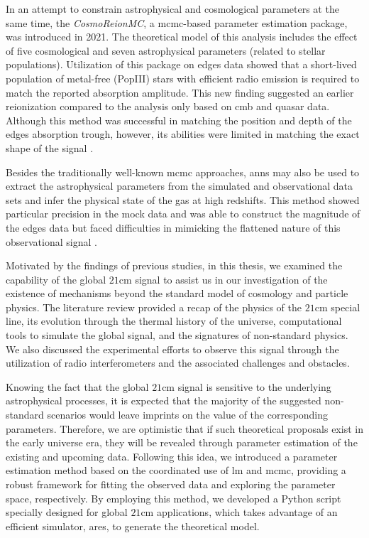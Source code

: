 \documentclass[12pt, TexShade, letterpaper]{report}
\begin{document}
In an attempt to constrain astrophysical and cosmological parameters at the same time, the \emph{CosmoReionMC}, a \gls{mcmc}-based parameter estimation package, was introduced in 2021. The theoretical model of this analysis includes the effect of five cosmological and seven astrophysical parameters (related to stellar populations). Utilization of this package on \gls{edges} data showed that a short-lived population of metal-free (PopIII) stars with efficient radio emission is required to match the reported absorption amplitude. This new finding suggested an earlier reionization compared to the analysis only based on \gls{cmb} and quasar data. Although this method was successful in matching the position and depth of the \gls{edges} absorption trough, however, its abilities were limited in matching the exact shape of the signal \cite{pe_mcmc_1}.\par

Besides the traditionally well-known \gls{mcmc} approaches, \gls{ann}s may also be used to extract the astrophysical parameters from the simulated and observational data sets and infer the physical state of the gas at high redshifts. This method showed particular precision in the mock data and was able to construct the magnitude of the \gls{edges} data but faced difficulties in mimicking the flattened nature of this observational signal \cite{pe_nn_1}.\par

Motivated by the findings of previous studies, in this thesis, we examined the capability of the global $\mathrm{21cm}$ signal to assist us in our investigation of the existence of mechanisms beyond the standard model of cosmology and particle physics. The literature review provided a recap of the physics of the $\mathrm{21cm}$ special line, its evolution through the thermal history of the universe, computational tools to simulate the global signal, and the signatures of non-standard physics. We also discussed the experimental efforts to observe this signal through the utilization of radio interferometers and the associated challenges and obstacles.\par

Knowing the fact that the global $\mathrm{21cm}$ signal is sensitive to the underlying astrophysical processes, it is expected that the majority of the suggested non-standard scenarios would leave imprints on the value of the corresponding parameters. Therefore, we are optimistic that if such theoretical proposals exist in the early universe era, they will be revealed through parameter estimation of the existing and upcoming data. Following this idea, we introduced a parameter estimation method based on the coordinated use of \gls{lm} and \gls{mcmc}, providing a robust framework for fitting the observed data and exploring the parameter space, respectively. By employing this method, we developed a Python script specially designed for global $\mathrm{21cm}$ applications, which takes advantage of an efficient simulator, \gls{ares}, to generate the theoretical model.\par
\end{document}
